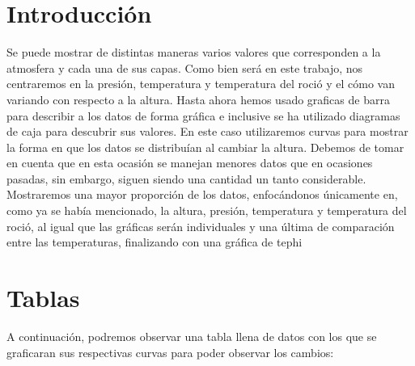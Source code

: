 \documentclass[a4paper,12pt]{article}
\begin{document}
\section{Introducción}
\noindent
Se puede mostrar de distintas maneras varios valores que corresponden a la atmosfera y cada una de sus capas. Como bien será en este trabajo, nos centraremos en la presión, temperatura y temperatura del roció y el cómo van variando con respecto a la altura. Hasta ahora hemos usado graficas de barra para describir a los datos de forma gráfica e inclusive se ha utilizado diagramas de caja para descubrir sus valores. En este caso utilizaremos curvas para mostrar la forma en que los datos se distribuían al cambiar la altura. Debemos de tomar en cuenta que en esta ocasión se manejan menores datos que en ocasiones pasadas, sin embargo, siguen siendo una cantidad un tanto considerable.\\

\noindent
Mostraremos una mayor proporción de los datos, enfocándonos únicamente en, como ya se había mencionado, la altura, presión, temperatura y temperatura del roció, al igual que las gráficas serán individuales y una última de comparación entre las temperaturas, finalizando con una gráfica de tephi

\newpage
\section{Tablas}
\noindent
A continuación, podremos observar una tabla llena de datos con los que se graficaran sus respectivas curvas para poder observar los cambios:\\
\end{document}
